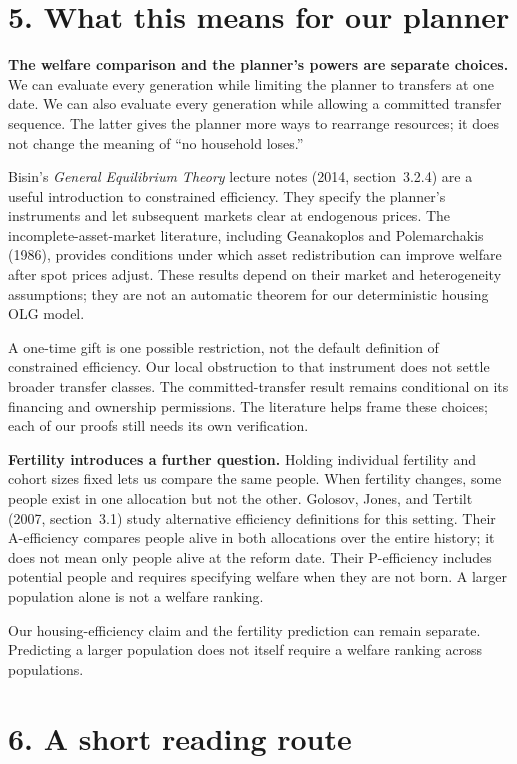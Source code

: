 \documentclass[11pt]{article}
\begin{document}
\newpage
\section*{5. What this means for our planner}

\textbf{The welfare comparison and the planner's powers are separate choices.}
We can evaluate every generation while limiting the planner to transfers at
one date. We can also evaluate every generation while allowing a committed
transfer sequence. The latter gives the planner more ways to rearrange
resources; it does not change the meaning of ``no household loses.''

Bisin's \emph{General Equilibrium Theory} lecture notes (2014, section~3.2.4)
are a useful introduction to constrained efficiency. They specify the
planner's instruments and let subsequent markets clear at endogenous prices.
The incomplete-asset-market literature, including Geanakoplos and Polemarchakis
(1986), provides conditions under which asset redistribution can improve
welfare after spot prices adjust. These results depend on their market and
heterogeneity assumptions; they are not an automatic theorem for our
deterministic housing OLG model.

A one-time gift is one possible restriction, not the default definition of
constrained efficiency. Our local obstruction to that instrument does not
settle broader transfer classes. The committed-transfer result remains
conditional on its financing and ownership permissions. The literature helps
frame these choices; each of our proofs still needs its own verification.

\textbf{Fertility introduces a further question.} Holding individual fertility
and cohort sizes fixed lets us compare the same people. When fertility
changes, some people exist in one allocation but not the other. Golosov,
Jones, and Tertilt (2007, section~3.1) study alternative efficiency definitions
for this setting. Their A-efficiency compares people alive in both allocations
over the entire history; it does not mean only people alive at the reform date.
Their P-efficiency includes potential people and requires specifying welfare
when they are not born. A larger population alone is not a welfare ranking.

Our housing-efficiency claim and the fertility prediction can remain separate.
Predicting a larger population does not itself require a welfare ranking
across populations.

\section*{6. A short reading route}
\end{document}
